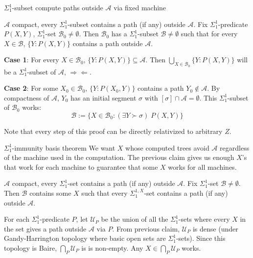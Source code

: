\begin{frame}{$\Sigma_1^1$-subset compute paths outside
$\mathcal{A}$ via fixed machine}
  \begin{claim}
    $\mathcal{A}$ compact, every $\Sigma_1^{1}$-subset contains a path (if
    any) outside $\mathcal{A}$. Fix $\Sigma_1^{1}$-predicate $P(X,Y)$,
    $\Sigma_1^{1}$-set $\mathcal{B}_0\neq\emptyset$. Then $\mathcal{B}_0$
    has a $\Sigma_1^{1}$-subset $\mathcal{B}\neq\emptyset$ such that for
    every $X\in\mathcal{B}$, $\{Y:P(X,Y)\}$ contains a path outside
    $\mathcal{A}$.
  \end{claim}

  \textbf{Case 1}: For every $X\in\mathcal{B}_0$,
  $\{Y:P(X,Y)\}\subseteq\mathcal{A}$. Then $\bigcup_{X\in\mathcal{B}_0}
  \{Y:P(X,Y)\}$ will be a $\Sigma_1^1$-subset of $\mathcal{A}$,
  $\Rightarrow\Leftarrow$.

  \vspace{0.5em}
  \textbf{Case 2}: For some $X_0\in\mathcal{B}_0$, $\{Y:P(X_0,Y)\}$
  contains a path $Y_0\not\in\mathcal{A}$. By compactness of $\mathcal{A}$,
  $Y_0$ has an initial segment $\sigma$ with $[\sigma]\cap\mathcal{A}
  =\emptyset$. This $\Sigma_1^1$-subset of $\mathcal{B}_0$ works:
  \[\mathcal{B}:= \{X\in\mathcal{B}_0: (\exists Y\succ\sigma)\; P(X,Y)\}\]

  Note that every step of this proof can be directly relativized to
  arbitrary $Z$.
\end{frame}

\begin{frame}{$\Sigma_1^1$-immunity basis theorem}
  We want $X$ whose computed trees avoid $\mathcal{A}$ regardless of the
  machine used in the computation. The previous claim gives us enough $X$'s
  that work for each machine to guarantee that some $X$ works for
  all machines.

  \vspace{1em}
  \begin{thm}
    $\mathcal{A}$ compact, every $\Sigma_1^{1}$-set contains a path (if
    any) outside $\mathcal{A}$. Fix $\Sigma_1^{1}$-set
    $\mathcal{B}\neq\emptyset$. Then $\mathcal{B}$ contains some $X$ such
    that every $\Sigma_1^{1,X}$-set contains a path (if any) outside
    $\mathcal{A}$.
  \end{thm}

  \vspace{1em}
  For each $\Sigma_1^1$-predicate $P$, let $\mathcal{U}_P$ be the union of
  all the $\Sigma_1^1$-sets where every $X$ in the set gives a path outside
  $\mathcal{A}$ via $P$. From previous claim, $\mathcal{U}_P$ is dense
  (under Gandy-Harrington topology where basic open sets are
  $\Sigma_1^1$-sets). Since this topology is Baire,
  $\bigcap_P\mathcal{U}_P$ is is non-empty. Any
  $X\in\bigcap_P\mathcal{U}_P$ works.
\end{frame}

